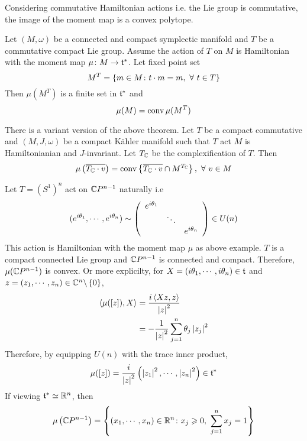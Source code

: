 \documentclass[a4paper,12pt]{article}
\begin{document}
	Considering commutative Hamiltonian actions i.e. the Lie group is commutative, the image of the moment map is a convex polytope.
	\begin{thm}
		Let $(M,\omega)$ be a connected and compact symplectic manifold and $T$ be a commutative compact Lie group. Assume the action of $T$ on $M$ is Hamiltonian with the moment map $\mu \colon M \rightarrow \mathfrak{t}^*$. Let fixed point set
		\begin{equation*}
			M^T = \left\{m \in M \colon t \cdot m = m,~\forall~t \in T\right\}
		\end{equation*}
		Then $\mu(M^T)$ is a finite set in $\mathfrak{t}^*$ and
		\begin{equation*}
			\mu(M) = \operatorname{conv} \mu(M^T)
		\end{equation*}
	\end{thm}
	\begin{rem}
		There is a variant version of the above theorem. Let $T$ be a compact commutative and $(M,J,\omega)$ be a compact K\"ahler manifold such that $T$ act $M$ is Hamiltonianian and $J$-invariant. Let $T_{\mathbb{C}}$ be the complexification of $T$. Then
		\begin{equation*}
			\mu\left(\overline{T_{\mathbb{C}} \cdot v}\right) = \operatorname{conv} \left\{\overline{T_{\mathbb{C}} \cdot v} \cap M^{T_{\mathbb{C}}}\right\},~\forall~ v \in M
		\end{equation*}
	\end{rem}

	\begin{exam}
		Let $T = (S^1)^n$ act on $\mathbb{C} P^{n-1}$ naturally i.e
		\begin{equation*}
			(e^{i\theta_1},\cdots,e^{i\theta_n}) \sim \left(
				\begin{array}{ccc}
					e^{i\theta_1} & & \\
					&\ddots & \\
					&&e^{i\theta_n}
				\end{array}
			\right) \in U(n)
		\end{equation*}
		This action is Hamiltonian with the moment map $\mu$ as above example. $T$ is a compact connected Lie group and $\mathbb{C} P^{n-1}$ is connected and compact. Therefore, $\mu(\mathbb{C} P^{n-1})$ is convex. Or more explicilty, for $X = (i\theta_1,\cdots,i\theta_n) \in \mathfrak{t}$ and $z = (z_1,\cdots,z_n) \in \mathbb{C}^n \backslash \left\{0\right\}$,
		\begin{equation*}
		 	\begin{split}
		 		\left\langle \mu([z]),X \right\rangle &= \frac{i\left\langle Xz,z \right\rangle}{\left\lvert z\right\lvert^2} \\
		 		&= -\frac{1}{\left\lvert z\right\lvert^2}\sum_{j=1}^n \theta_j\left\lvert z_j\right\lvert^2
		 	\end{split}
		\end{equation*}
		Therefore, by equipping $U(n)$ with the trace inner product,
		\begin{equation*}
			\mu([z]) = \frac{i}{\left\lvert z\right\lvert^2}\left(\left\lvert z_1\right\lvert^2,\cdots,\left\lvert z_n\right\lvert^2\right) \in \mathfrak{t}^*
		\end{equation*}
		If viewing $\mathfrak{t}^* \simeq \mathbb{R}^n$, then
		\begin{equation*}
			\mu\left(\mathbb{C} P^{n-1}\right) = \left\{(x_1,\cdots,x_n) \in \mathbb{R}^n \colon x_j \geqslant 0,~\sum_{j=1}^nx_j = 1\right\}
		\end{equation*}
	\end{exam}
\end{document}
